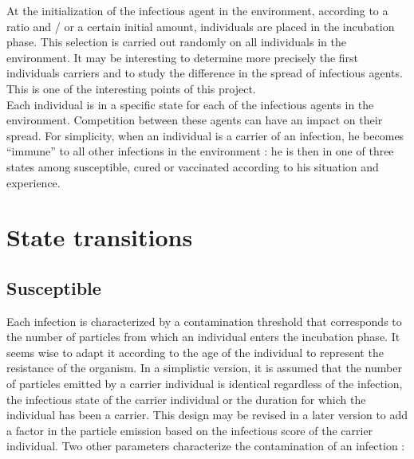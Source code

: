 At the initialization of the infectious agent in the environment, according to a ratio and / or a certain initial amount, individuals are placed in the incubation phase. This selection is carried out randomly on all individuals in the environment. It may be interesting to determine more precisely the first individuals carriers and to study the difference in the spread of infectious agents. This is one of the interesting points of this project.\\

Each individual is in a specific state for each of the infectious agents in the environment. Competition between these agents can have an impact on their spread. For simplicity, when an individual is a carrier of an infection, he becomes ``immune'' to all other infections in the environment : he is then in one of three states among susceptible, cured or vaccinated according to his situation and experience.\\

\newpage

\section{State transitions}

\subsection{Susceptible}

Each infection is characterized by a contamination threshold that corresponds to the number of particles from which an individual enters the incubation phase. It seems wise to adapt it according to the age of the individual to represent the resistance of the organism. In a simplistic version, it is assumed that the number of particles emitted by a carrier individual is identical regardless of the infection, the infectious state of the carrier individual or the duration for which the individual has been a carrier. This design may be revised in a later version to add a factor in the particle emission based on the infectious score of the carrier individual. Two other parameters characterize the contamination of an infection :\\

